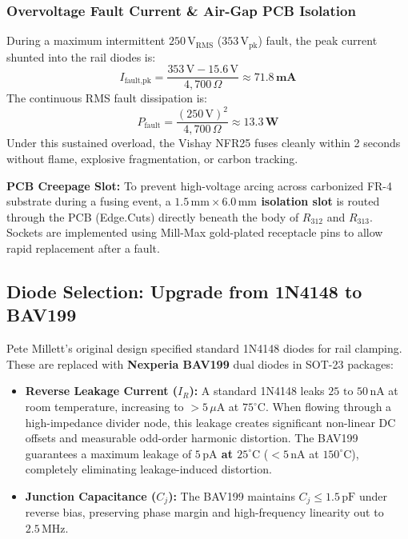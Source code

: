 \documentclass[11pt, letterpaper]{article}
\begin{document}
\subsubsection{Overvoltage Fault Current \& Air-Gap PCB Isolation}
During a maximum intermittent $250\,\text{V}_{\text{RMS}}$ ($353\,\text{V}_{\text{pk}}$) fault, the peak current shunted into the rail diodes is:
\begin{equation}
    I_{\text{fault,pk}} = \frac{353\,\text{V} - 15.6\,\text{V}}{4{,}700\,\Omega} \approx \mathbf{71.8\,\text{mA}}
\end{equation}
The continuous RMS fault dissipation is:
\begin{equation}
    P_{\text{fault}} = \frac{(250\,\text{V})^2}{4{,}700\,\Omega} \approx \mathbf{13.3\,\text{W}}
\end{equation}
Under this sustained overload, the Vishay NFR25 fuses cleanly within 2 seconds without flame, explosive fragmentation, or carbon tracking. 

\textbf{PCB Creepage Slot:} To prevent high-voltage arcing across carbonized FR-4 substrate during a fusing event, a \textbf{$1.5\,\text{mm} \times 6.0\,\text{mm}$ isolation slot} is routed through the PCB (\textsf{Edge.Cuts}) directly beneath the body of $R_{312}$ and $R_{313}$. Sockets are implemented using Mill-Max gold-plated receptacle pins to allow rapid replacement after a fault.

\subsection{Diode Selection: Upgrade from 1N4148 to BAV199}
Pete Millett's original design specified standard 1N4148 diodes for rail clamping. These are replaced with \textbf{Nexperia BAV199} dual diodes in SOT-23 packages:
\begin{itemize}[leftmargin=1.5em]
    \item \textbf{Reverse Leakage Current ($I_R$):} A standard 1N4148 leaks $25\text{ to }50\,\text{nA}$ at room temperature, increasing to $>5\,\mu\text{A}$ at $75^\circ\text{C}$. When flowing through a high-impedance divider node, this leakage creates significant non-linear DC offsets and measurable odd-order harmonic distortion. The BAV199 guarantees a maximum leakage of \textbf{$5\,\text{pA}$ at $25^\circ\text{C}$} ($<5\,\text{nA}$ at $150^\circ\text{C}$), completely eliminating leakage-induced distortion.
    \item \textbf{Junction Capacitance ($C_j$):} The BAV199 maintains $C_j \le 1.5\,\text{pF}$ under reverse bias, preserving phase margin and high-frequency linearity out to $2.5\,\text{MHz}$.
\end{itemize}
\end{document}
